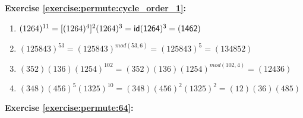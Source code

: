 \noindent\textbf{Exercise \ref{exercise:permute:cycle_order_1}:}
\begin{enumerate}[{a.}]
\item
$(1264)^{11} = [(1264)^4]^2(1264)^3 = \sf{id}(1264)^3 = (1462)$

\item
$(125843)^{53} = (125843)^{mod(53,6)} = (125843)^5 = (134852)$

\item
$(352)(136)(1254)^{102} = (352)(136)(1254)^{mod(102,4)} = (12436)$

\item
$(348)(456)^5(1325)^{10} = (348)(456)^2(1325)^2 = (12)(36)(485)$
\end{enumerate}

\noindent\textbf{Exercise \ref{exercise:permute:64}:}
%
